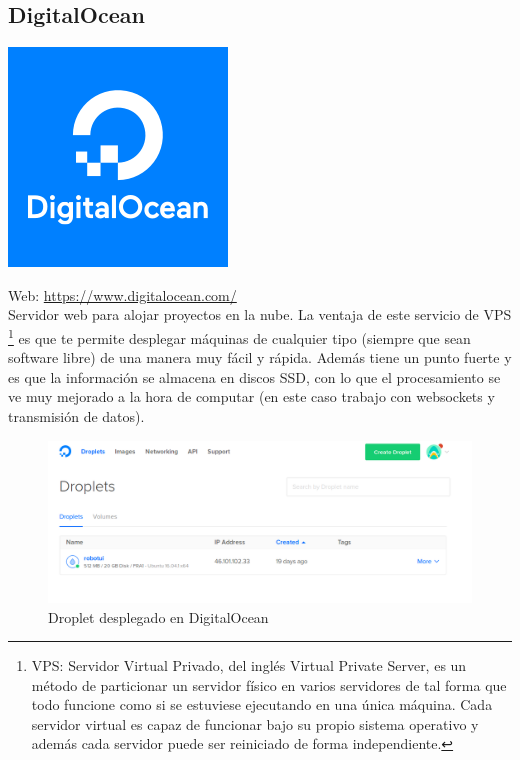 \subsection{DigitalOcean}

\begin{center}\includegraphics[scale=0.35]{imagenes/docean-logo.png}\end{center}

Web: \url{https://www.digitalocean.com/}\\

Servidor web para alojar proyectos en la nube. La ventaja de este servicio de VPS \footnote{ VPS: Servidor Virtual Privado, del inglés Virtual Private Server, es un método de particionar un servidor
físico en varios servidores de tal forma que todo funcione como si se estuviese ejecutando en una única máquina. Cada servidor virtual es capaz de funcionar bajo su propio sistema operativo y
además cada servidor puede ser reiniciado de forma independiente.} es que te permite desplegar máquinas de cualquier tipo (siempre que sean software libre) de una manera muy fácil y rápida. 
Además tiene un punto fuerte y es que la información se almacena en discos SSD, con lo que el procesamiento se ve muy mejorado a la hora de computar (en este caso trabajo con websockets y 
transmisión de datos).\\

\begin{figure}[H]
\begin{center}
\includegraphics[scale=0.45]{imagenes/droplets.png}
\caption{Droplet desplegado en DigitalOcean}
\end{center}
\end{figure}


